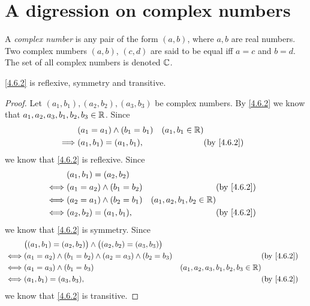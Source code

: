 \section{A digression on complex numbers}\label{sec:4.6}

\setcounter{thm}{1}
\begin{defn}\label{4.6.2}
  A \emph{complex number} is any pair of the form \((a, b)\), where \(a, b\) are real numbers.
  Two complex numbers \((a, b)\), \((c, d)\) are said to be equal iff \(a = c\) and \(b = d\).
  The set of all complex numbers is denoted \(\mathbb{C}\).
\end{defn}

\begin{ac}\label{ac:4.6.1}
  \cref{4.6.2} is reflexive, symmetry and transitive.
\end{ac}

\begin{proof}
  Let \((a_1, b_1), (a_2, b_2), (a_3, b_3)\) be complex numbers.
  By \cref{4.6.2} we know that \(a_1, a_2, a_3, b_1, b_2, b_3 \in \mathbb{R}\).
  Since
  \begin{align*}
             & (a_1 = a_1) \land (b_1 = b_1) & (a_1, b_1 \in \R)              \\
    \implies & (a_1, b_1) = (a_1, b_1),      &                   & \by{4.6.2}
  \end{align*}
  we know that \cref{4.6.2} is reflexive.
  Since
  \begin{align*}
         & (a_1, b_1) = (a_2, b_2)                                                  \\
    \iff & (a_1 = a_2) \land (b_1 = b_2) &                             & \by{4.6.2} \\
    \iff & (a_2 = a_1) \land (b_2 = b_1) & (a_1, a_2, b_1, b_2 \in \R)              \\
    \iff & (a_2, b_2) = (a_1, b_1),      &                             & \by{4.6.2}
  \end{align*}
  we know that \cref{4.6.2} is symmetry.
  Since
  \begin{align*}
         & \big((a_1, b_1) = (a_2, b_2)\big) \land \big((a_2, b_2) = (a_3, b_3)\big)                                                      \\
    \iff & (a_1 = a_2) \land (b_1 = b_2) \land (a_2 = a_3) \land (b_2 = b_3)         &                                       & \by{4.6.2} \\
    \iff & (a_1 = a_3) \land (b_1 = b_3)                                             & (a_1, a_2, a_3, b_1, b_2, b_3 \in \R)              \\
    \iff & (a_1, b_1) = (a_3, b_3),                                                  &                                       & \by{4.6.2}
  \end{align*}
  we know that \cref{4.6.2} is transitive.
\end{proof}

